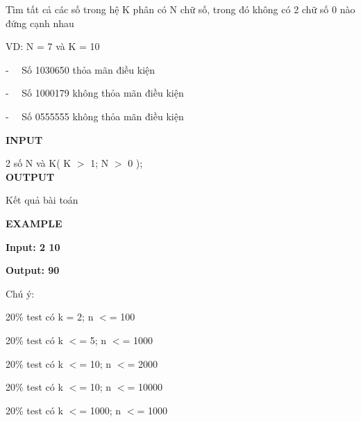 



    Tìm tất cả các số trong hệ K phân có N chữ số, trong đó không có 2 chữ số 0 nào đứng cạnh nhau   



    VD: N = 7 và K = 10   

    -   Số 1030650 thỏa mãn điều kiện   

    -   Số 1000179 không thỏa mãn điều kiện   

    -   Số 0555555 không thỏa mãn điều kiện   



\textbf{     INPUT    }

    2 số N và K( K $>$ 1; N $>$ 0 );    
\\

\textbf{     OUTPUT    }

    Kết quả bài toán   



\textbf{     EXAMPLE    }

\textbf{      Input: 2 10     }

\textbf{      Output: 90     }



     Chú ý:    

     20\% test có k = 2; n $<$= 100    

     20\% test có k $<$= 5; n $<$= 1000    

     20\% test có k $<$= 10; n $<$= 2000    

     20\% test có k $<$= 10; n $<$= 10000    

     20\% test có k $<$= 1000; n $<$= 1000     
\\
